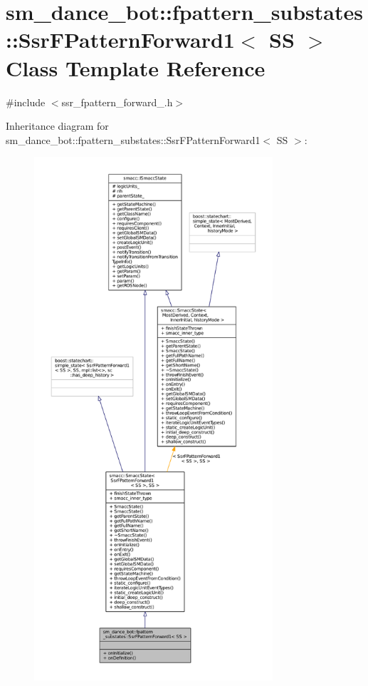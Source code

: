 \hypertarget{structsm__dance__bot_1_1fpattern__substates_1_1SsrFPatternForward1}{}\section{sm\+\_\+dance\+\_\+bot\+:\+:fpattern\+\_\+substates\+:\+:Ssr\+F\+Pattern\+Forward1$<$ SS $>$ Class Template Reference}
\label{structsm__dance__bot_1_1fpattern__substates_1_1SsrFPatternForward1}


{\ttfamily \#include $<$ssr\+\_\+fpattern\+\_\+forward\+\_.\+h$>$}



Inheritance diagram for sm\+\_\+dance\+\_\+bot\+:\+:fpattern\+\_\+substates\+:\+:Ssr\+F\+Pattern\+Forward1$<$ SS $>$\+:
\nopagebreak
\begin{figure}[H]
\begin{center}
\leavevmode
\includegraphics[height=550pt]{structsm__dance__bot_1_1fpattern__substates_1_1SsrFPatternForward1__inherit__graph}
\end{center}
\end{figure}


